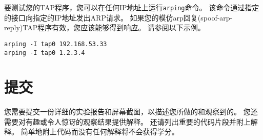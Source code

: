 要测试您的TAP程序，您可以在任何IP地址上运行\verb|arping|命令。 
该命令通过指定的接口向指定的IP地址发出ARP请求。 
如果您的模仿arp回复(spoof-arp-reply)TAP程序有效，您应该能够得到响应。 
请参阅以下示例。

\begin{lstlisting}
arping -I tap0 192.168.53.33
arping -I tap0 1.2.3.4
\end{lstlisting}


\section{提交}

您需要提交一份详细的实验报告和屏幕截图，以描述您所做的和观察到的。 
您还需要对有趣或令人惊讶的观察结果提供解释。 
还请列出重要的代码片段并附上解释。 
简单地附上代码而没有任何解释将不会获得学分。






